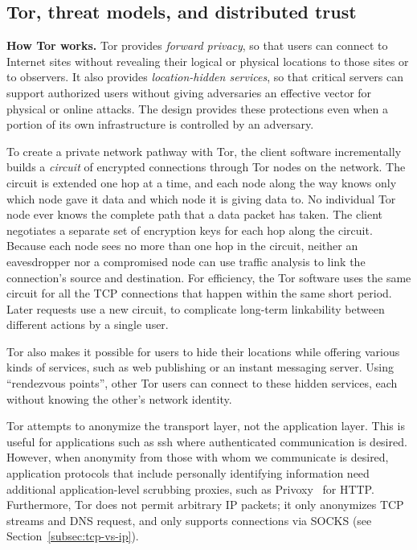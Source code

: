 \documentclass{llncs}
\begin{document}
\subsection{Tor, threat models, and distributed trust}
\label{sec:what-is-tor}


\noindent
{\bf How Tor works.}
Tor provides \emph{forward privacy}, so that users can connect to
Internet sites without revealing their logical or physical locations
to those sites or to observers.  It also provides \emph{location-hidden
services}, so that critical servers can support authorized users without
giving adversaries an effective vector for physical or online attacks.
The design provides these protections even when a portion of its own
infrastructure is controlled by an adversary.

To create a private network pathway with Tor, the client software
incrementally builds a \emph{circuit} of encrypted connections through
Tor nodes on the network. The circuit is extended one hop at a time, and
each node along the way knows only which node gave it data and which
node it is giving data to. No individual Tor node ever knows the complete
path that a data packet has taken. The client negotiates a separate set
of encryption keys for each hop along the circuit. %
Because each node sees no more than one hop in the
circuit, neither an eavesdropper nor a compromised node can use traffic
analysis to link the connection's source and destination.
For efficiency, the Tor software uses the same circuit for all the TCP
connections that happen within the same short period.
Later requests use a new
circuit, to complicate long-term linkability between different actions by
a single user.

Tor also makes it possible for users to hide their locations while
offering various kinds of services, such as web publishing or an instant
messaging server. Using ``rendezvous points'', other Tor users can
connect to these hidden services, each without knowing the other's network
identity.

Tor attempts to anonymize the transport layer, not the application layer.
This is useful for applications such as ssh
where authenticated communication is desired. However, when anonymity from
those with whom we communicate is desired,
application protocols that include personally identifying information need
additional application-level scrubbing proxies, such as
Privoxy~\cite{privoxy} for HTTP\@.  Furthermore, Tor does not permit arbitrary
IP packets; it only anonymizes TCP streams and DNS request, and only supports
connections via SOCKS (see Section~\ref{subsec:tcp-vs-ip}).
\end{document}
